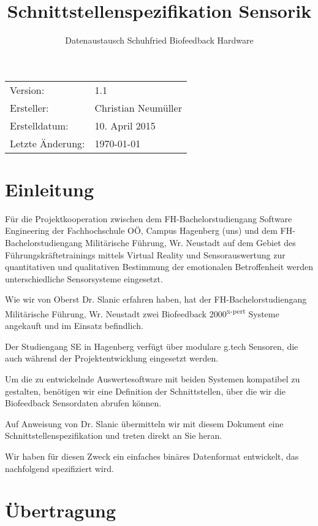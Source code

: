\documentclass[a4paper,parskip=full,oneside]{scrartcl}
\title{Schnittstellenspezifikation Sensorik}
\subtitle{Datenaustausch Schuhfried Biofeedback Hardware}
\date{\vspace{-2\baselineskip}}
\begin{document}
\maketitle

\begin{center}
\begin{tabular}{ll}
Version: & 1.1 \\
Ersteller: & Christian Neumüller \\
Erstelldatum: & 10. April 2015 \\
Letzte Änderung: & \today \\
\end{tabular}
\end{center}
\bigskip
\tableofcontents

\pagebreak
\section{Einleitung}
Für die Projektkooperation zwischen dem FH-Bachelorstudiengang Software
Engineering der Fachhochschule OÖ, Campus Hagenberg (uns) und dem
FH-Bachelorstudiengang Militärische Führung, Wr. Neustadt auf dem Gebiet
des Führungskräftetrainings mittels Virtual Reality und Sensorauswertung zur
quantitativen und qualitativen Bestimmung der emotionalen Betroffenheit werden
unterschiedliche Sensorsysteme eingesetzt.

Wie wir von Oberst Dr. Slanic erfahren haben, hat der FH-Bachelorstudiengang
Militärische Führung, Wr. Neustadt zwei Biofeedback 2000\textsuperscript{x-pert} Systeme
angekauft und im Einsatz befindlich.

Der Studiengang SE in Hagenberg verfügt über modulare g.tech Sensoren, die auch während
der Projektentwicklung eingesetzt werden.

Um die zu entwickelnde Auswertesoftware mit beiden Systemen kompatibel zu gestalten,
benötigen wir eine Definition der Schnittstellen, über die wir die Biofeedback Sensordaten
abrufen können.

Auf Anweisung von Dr. Slanic übermitteln wir mit diesem Dokument eine Schnittstellenspezifikation
und treten direkt an Sie heran.

Wir haben für diesen Zweck ein einfaches binäres Datenformat entwickelt,
das nachfolgend spezifiziert wird.

\section{Übertragung}
\end{document}

